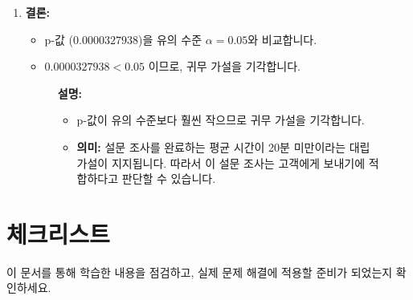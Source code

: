\documentclass[11pt,a4paper]{article}
\theoremstyle{definition}
\begin{document}
\begin{enumerate}
    \item \textbf{결론:}
    \begin{itemize}
        \item p-값 ($0.0000327938$)을 유의 수준 $\alpha = 0.05$와 비교합니다.
        \item $0.0000327938 < 0.05$ 이므로, 귀무 가설을 기각합니다.
    \end{itemize}
    \begin{figure}[h!]
        \centering
        \label{fig:excel_survey_p_value_conclusion}
        \vspace{0.5em}
        \textbf{설명:}
        \begin{itemize}
            \item p-값이 유의 수준보다 훨씬 작으므로 귀무 가설을 기각합니다.
            \item \textbf{의미:} 설문 조사를 완료하는 평균 시간이 20분 미만이라는 대립 가설이 지지됩니다. 따라서 이 설문 조사는 고객에게 보내기에 적합하다고 판단할 수 있습니다.
        \end{itemize}
    \end{figure}
\end{enumerate}

\newpage
\section*{체크리스트}

이 문서를 통해 학습한 내용을 점검하고, 실제 문제 해결에 적용할 준비가 되었는지 확인하세요.
\end{document}
